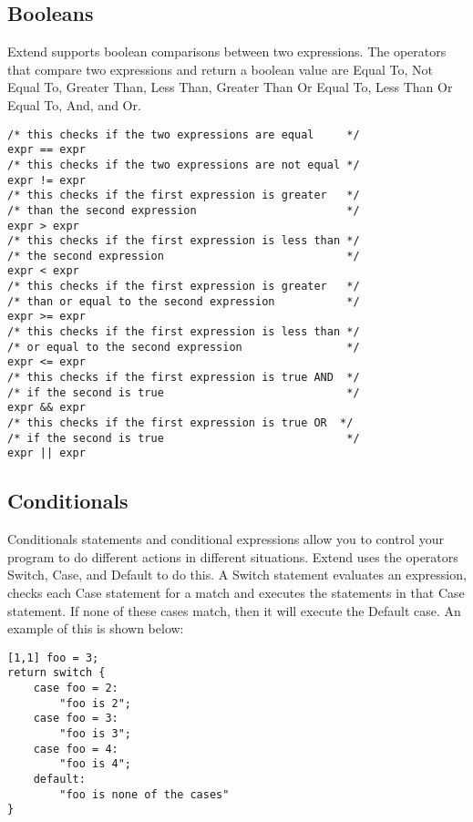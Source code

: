 	\subsection{Booleans}
		Extend supports boolean comparisons between two expressions. The operators that compare two expressions and return a boolean value are Equal To, Not Equal To, Greater Than, Less Than, Greater Than Or Equal To, Less Than Or Equal To, And, and Or. 
		\begin{lstlisting}
/* this checks if the two expressions are equal     */
expr == expr 
/* this checks if the two expressions are not equal */
expr != expr
/* this checks if the first expression is greater   */
/* than the second expression                       */
expr > expr
/* this checks if the first expression is less than */
/* the second expression                            */
expr < expr
/* this checks if the first expression is greater   */
/* than or equal to the second expression           */
expr >= expr
/* this checks if the first expression is less than */
/* or equal to the second expression                */
expr <= expr
/* this checks if the first expression is true AND  */
/* if the second is true                            */
expr && expr
/* this checks if the first expression is true OR  */
/* if the second is true                            */
expr || expr
		\end{lstlisting}
		

	\subsection{Conditionals}
		Conditionals statements and conditional expressions allow you to control your program to do different actions in different situations. Extend uses the operators Switch, Case, and Default to do this. A Switch statement evaluates an expression, checks each Case statement for a match and executes the statements in that Case statement. If none of these cases match, then it will execute the Default case. An example of this is shown below:
		\begin{lstlisting}
[1,1] foo = 3;
return switch {
	case foo = 2:
		"foo is 2";
	case foo = 3:
		"foo is 3";
	case foo = 4:
		"foo is 4";
	default:
		"foo is none of the cases"
}
		\end{lstlisting}